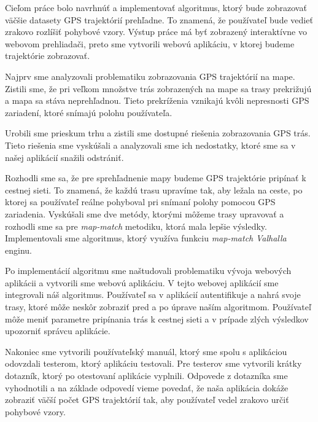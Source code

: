 \indent Cieľom práce bolo navrhnúť a implementovať algoritmus, ktorý bude zobrazovať väčšie datasety GPS trajektórií prehľadne. To znamená, že používateľ bude vedieť zrakovo rozlíšiť pohybové vzory. Výstup práce má byť zobrazený interaktívne vo webovom prehliadači, preto sme vytvorili webovú aplikáciu, v ktorej budeme trajektórie zobrazovať. 

Najprv sme analyzovali problematiku zobrazovania GPS trajektórií na mape. Zistili sme, že pri veľkom množstve trás zobrazených na mape sa trasy prekrižujú a mapa sa stáva neprehľadnou. Tieto prekríženia vznikajú kvôli nepresnosti GPS zariadení, ktoré snímajú polohu používateľa. 

Urobili sme prieskum trhu a zistili sme dostupné riešenia zobrazovania GPS trás. Tieto riešenia sme vyskúšali a analyzovali sme ich nedostatky, ktoré sme sa v našej aplikácií snažili odstrániť. 

Rozhodli sme sa, že pre sprehľadnenie mapy budeme GPS trajektórie pripínať k cestnej sieti. To znamená, že každú trasu upravíme tak, aby ležala na ceste, po ktorej sa používateľ reálne pohyboval pri snímaní polohy pomocou GPS zariadenia. Vyskúšali sme dve metódy, ktorými môžeme trasy upravovať a rozhodli sme sa pre \textit{map-match} metodiku, ktorá mala lepšie výsledky. Implementovali sme algoritmus, ktorý využíva funkciu \textit{map-match}  \textit{Valhalla} enginu. 

Po implementácií algoritmu sme naštudovali problematiku vývoja webových aplikácii a vytvorili sme webovú aplikáciu. V tejto webovej aplikácií sme integrovali náš algoritmus. Používateľ sa v aplikácií autentifikuje a nahrá svoje trasy, ktoré môže neskôr zobraziť pred a po úprave naším algoritmom. Používateľ môže meniť parametre pripínania trás k cestnej sieti a v prípade zlých výsledkov upozorniť správcu aplikácie. 

Nakoniec sme vytvorili používateľský manuál, ktorý sme spolu s aplikáciou odovzdali testerom, ktorý aplikáciu testovali. Pre testerov sme vytvorili krátky dotazník, ktorý po otestovaní aplikácie vyplnili. Odpovede z dotazníka sme vyhodnotili a na základe odpovedí vieme povedať, že naša aplikácia dokáže zobraziť väčší počet GPS trajektórií tak, aby používateľ vedel zrakovo určiť pohybové vzory. 